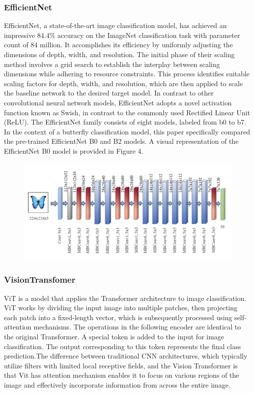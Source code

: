\documentclass[10pt,twocolumn,letterpaper]{article}
\begin{document}
\subsubsection{EfficientNet} 
EfficientNet, a state-of-the-art image classification model, has achieved an impressive 84.4\% accuracy on the ImageNet classification task with parameter count of 84 million. It accomplishes its efficiency by uniformly adjusting the dimensions of depth, width, and resolution. The initial phase of their scaling method involves a grid search to establish the interplay between scaling dimensions while adhering to resource constraints. This process identifies suitable scaling factors for depth, width, and resolution, which are then applied to scale the baseline network to the desired target model. In contrast to other convolutional neural network models, EfficientNet adopts a novel activation function known as Swish, in contrast to the commonly used Rectified Linear Unit (ReLU). The EfficientNet family consists of eight models, labeled from b0 to b7. In the context of a butterfly classification model, this paper specifically compared the pre-trained EfficientNet B0 and B2 models. A visual representation of the EfficientNet B0 model is provided in Figure 4.
\begin{figure}[t]
	\centering
	\includegraphics[width=\columnwidth]{effb0}
	\caption{}
	\label{fig:svm-lr}
\end{figure}


\subsubsection{VisionTransfomer} 
ViT is a model that applies the Transformer architecture to image classification. ViT works by dividing the input image into multiple patches, then projecting each patch into a fixed-length vector, which is subsequently processed using self-attention mechanisms\cite{wu2021vision}. The operations in the following encoder are identical to the original Transformer. A special token is added to the input for image classification. The output corresponding to this token represents the final class prediction.The difference between traditional CNN architectures, which typically utilize filters with limited local receptive fields, and the Vision Transformer is that Vit has attention mechanism enables it to focus on various regions of the image and effectively incorporate information from across the entire image\cite{bazi2021vision}.
\end{document}
